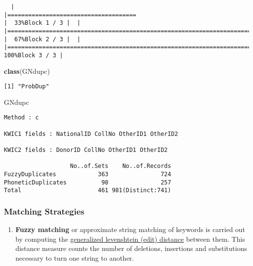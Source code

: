 \documentclass[
]{article}
\newenvironment{Shaded}{\begin{snugshade}}{\end{snugshade}}
\newcommand{\KeywordTok}[1]{\textcolor[rgb]{0.13,0.29,0.53}{\textbf{#1}}}
\newcommand{\NormalTok}[1]{#1}
\providecommand{\tightlist}{%
  \setlength{\itemsep}{0pt}\setlength{\parskip}{0pt}}
\begin{document}
\begin{verbatim}
  |                                                                                                                       |=====================================                                                                          |  33%Block 1 / 3 |  |                                                                                                                       |==========================================================================                                     |  67%Block 2 / 3 |  |                                                                                                                       |===============================================================================================================| 100%Block 3 / 3 |
\end{verbatim}

\begin{Shaded}
\begin{Highlighting}[]
\KeywordTok{class}\NormalTok{(GNdupc)}
\end{Highlighting}
\end{Shaded}

\begin{verbatim}
[1] "ProbDup"
\end{verbatim}

\begin{Shaded}
\begin{Highlighting}[]
\NormalTok{GNdupc}
\end{Highlighting}
\end{Shaded}

\begin{verbatim}
Method : c

KWIC1 fields : NationalID CollNo OtherID1 OtherID2

KWIC2 fields : DonorID CollNo OtherID1 OtherID2
 
                   No..of.Sets    No..of.Records
FuzzyDuplicates            363               724
PhoneticDuplicates          98               257
Total                      461 981(Distinct:741)
\end{verbatim}

\hypertarget{matching-strategies}{%
\subsubsection{Matching Strategies}\label{matching-strategies}}

\begin{enumerate}
\def\labelenumi{\arabic{enumi}.}
\tightlist
\item
  \textbf{Fuzzy matching} or approximate string matching of keywords is
  carried out by computing the
  \href{https://en.wikipedia.org/wiki/Levenshtein_distance}{generalized
  levenshtein (edit) distance} between them. This distance measure
  counts the number of deletions, insertions and substitutions necessary
  to turn one string to another.
\end{enumerate}
\end{document}
